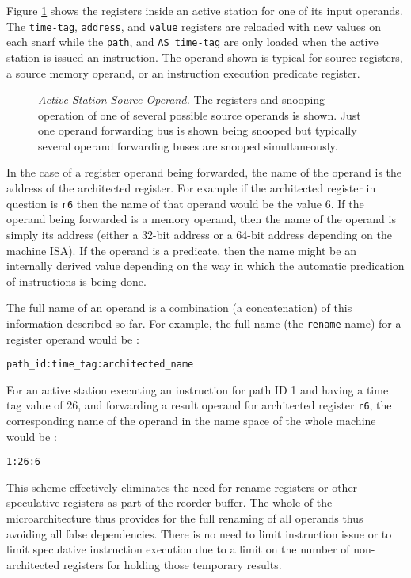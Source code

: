 \documentclass[10pt,dvips]{article}
\begin{document}
Figure \ref{fig:source} shows the registers inside an active
station for one of its input operands.  The 
\texttt{time-tag},
\texttt{address}, and
\texttt{value} registers are reloaded with new values on each snarf
while the
\texttt{path}, and
\texttt{AS time-tag} are only loaded when the active station is
issued an instruction.
The operand shown is typical for source registers, a source memory
operand, or an instruction execution predicate register.

\begin{figure}
\centering
{}
\caption{{\em Active Station Source Operand.} The registers and snooping
operation of one of several possible source operands is shown.
Just one operand forwarding bus is shown being snooped but
typically several operand forwarding buses are snooped simultaneously.}
\label{fig:source}
\end{figure}

In the case of a register operand being forwarded, the name of the
operand is the address of the architected register.  For example
if the architected register in question is {\tt r6} then the
name of that operand would be the value 6.  If the operand
being forwarded is a memory operand, then the name of the operand
is simply its address (either a 32-bit address or a 64-bit address
depending on the machine ISA).  If the operand is a predicate,
then the name might be an internally derived value depending on
the way in which the automatic predication of instructions is
being done.  

The full name of an operand is a combination (a concatenation) of this
information described so far.  For example, the full name (the
{\tt rename} name) for a register operand would be :

{\tt path\_id:time\_tag:architected\_name}

For an active station executing an instruction for path ID 1
and having a time tag value of 26, and forwarding a result operand
for architected register \texttt{r6}, the corresponding name
of the operand in the name space of the whole machine would be :

{\tt 1:26:6}

This scheme effectively eliminates the need for rename registers
or other speculative registers as part of the reorder buffer.
The whole of the microarchitecture thus provides for the full renaming
of all operands thus avoiding all false dependencies.
There is no need to limit instruction issue or to limit speculative
instruction execution due to a limit on the number of non-architected
registers for holding those temporary results.
\end{document}
